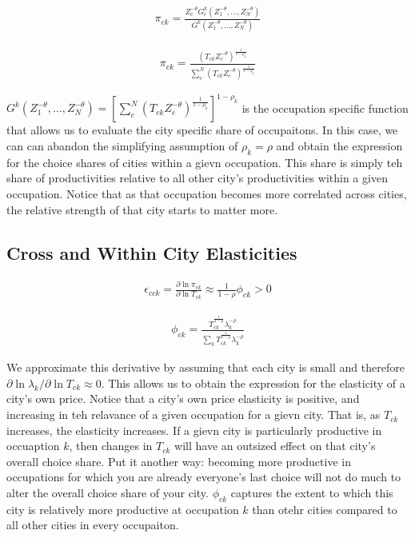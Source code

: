 \documentclass[10pt]{article}
\begin{document}
\begin{align}
    \pi_{ck} = \frac{Z_c^{- \theta} G_c^k(Z_1^{- \theta}, \dots, Z_N^{- \theta})}{G^k(Z_1^{- \theta}, \dots, Z_N^{- \theta})}
\end{align}

\begin{align}
    \pi_{ck} = \frac{(T_{ck} Z_c^{-\theta})^{\frac{1}{1 - \rho_k}}}{\sum_{c}^{N} (T_{ck} Z_c^{-\theta})^{\frac{1}{1 - \rho_k}}}
\end{align}

$G^k (Z_1^{-\theta}, \dots, Z_N^{-\theta}) = [\sum_{c}^{N} (T_{ck} Z_c^{-\theta})^{\frac{1}{1 - \rho_k}}]^{1 - \rho_k}$ is the occupation specific function that allows us to evaluate the city specific share of occupaitons. In this case, we can can abandon the simplifying assumption of $\rho_k = \rho$ and obtain the expression for the choice shares of cities within a gievn occupation. This share is simply teh share of productivities relative to all other city's productivities within a given occupation. Notice that as that occupation becomes more correlated across cities, the relative strength of that city starts to matter more.

\subsection{Cross and Within City Elasticities}

\begin{align}
    \epsilon_{cck} = \frac{\partial \ln \pi_{ck}}{\partial \ln T_{ck}} \approx \frac{1}{1 - \rho} \phi_{ck} > 0
\end{align}

\begin{align}
    \phi_{ck} = \frac{T_{ck}^{\frac{1}{1 - \rho}} \lambda_k^{- \rho}}{\sum_{k}^{} T_{ck}^{\frac{1}{1 - \rho}} \lambda_k^{- \rho}}
\end{align}

We approximate this derivative by assuming that each city is small and therefore $\partial \ln \lambda_k / \partial \ln T_{ck} \approx 0$. This allows us to obtain the expression for the elasticity of a city's own price. Notice that a city's own price elasticity is positive, and increasing in teh relavance of a given occupation for a gievn city. That is, as $T_{ck}$ increases, the elasticity increases. If a gievn city is particularly productive in occuaption $k$, then changes in $T_{ck}$ will have an outsized effect on that city's overall choice share. Put it another way: becoming more productive in occupations for which you are already everyone's last choice will not do much to alter the overall choice share of your city. $\phi_{ck}$ captures the extent to which this city is relatively more productive at occupation $k$ than otehr cities compared to all other cities in every occupaiton.
\end{document}
